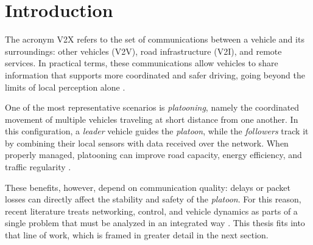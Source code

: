 \chapter{Introduction}
\label{ch:intro}

The acronym V2X refers to the set of communications between a vehicle and its surroundings: other vehicles (V2V), road infrastructure (V2I), and remote services. In practical terms, these communications allow vehicles to share information that supports more coordinated and safer driving, going beyond the limits of local perception alone \cite{dressler2019cooperative,segata2016safe}.

One of the most representative scenarios is \emph{platooning}, namely the coordinated movement of multiple vehicles traveling at short distance from one another. In this configuration, a \emph{leader} vehicle guides the \emph{platoon}, while the \emph{followers} track it by combining their local sensors with data received over the network. When properly managed, platooning can improve road capacity, energy efficiency, and traffic regularity \cite{robinson2010operating,segata2016safe}.

These benefits, however, depend on communication quality: delays or packet losses can directly affect the stability and safety of the \emph{platoon}. For this reason, recent literature treats networking, control, and vehicle dynamics as parts of a single problem that must be analyzed in an integrated way \cite{giordano2019joint,segata2023multi-technology}. This thesis fits into that line of work, which is framed in greater detail in the next section.
